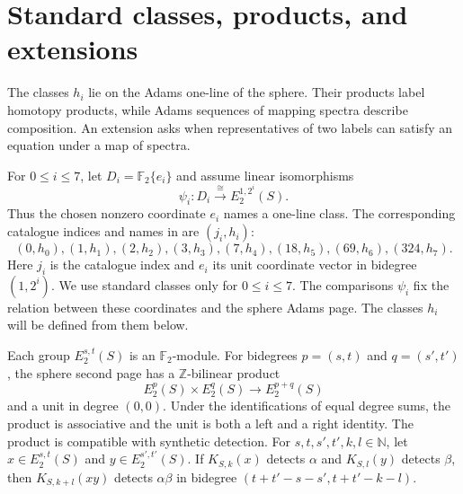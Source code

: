 \section{Standard classes, products, and extensions}

The classes $h_i$ lie on the Adams one-line of the sphere. Their products
label homotopy products, while Adams sequences of mapping spectra describe
composition. An extension asks when representatives of two labels can
satisfy an equation under a map of spectra.

\begin{definition}
\label{sem:AdamsSynthetic:hi-data}
For $0\leq i\leq7$, let $D_i=\mathbb F_2\{e_i\}$ and assume linear
isomorphisms
\[
 \psi_i:D_i\xrightarrow{\cong}E_2^{1,2^i}(S).
\]
Thus the chosen nonzero coordinate $e_i$ names a one-line class. The
corresponding catalogue indices and names in \cite{LinProgram} are
$(j_i,h_i)$:
\[
(0,h_0),(1,h_1),(2,h_2),(3,h_3),(7,h_4),(18,h_5),(69,h_6),(324,h_7).
\]
Here $j_i$ is the catalogue index and $e_i$ its unit coordinate vector
in bidegree $(1,2^i)$. We use standard classes only for
$0\leq i\leq7$.
The comparisons $\psi_i$ fix the relation between these coordinates
and the sphere Adams page. The classes $h_i$ will be defined from them
below.
\end{definition}

\begin{definition}
\label{sem:AdamsSynthetic:sphere-second-page-algebra}
Each group $E_2^{s,t}(S)$ is an $\mathbb F_2$-module. For bidegrees
$p=(s,t)$ and $q=(s',t')$, the sphere second page has a
$\mathbb Z$-bilinear product
\[
E_2^p(S)\times E_2^q(S)\longrightarrow E_2^{p+q}(S)
\]
and a unit in degree $(0,0)$. Under the identifications of equal degree sums, the product is associative and the unit is both a left and a right identity.
The product is compatible with synthetic detection. For
$s,t,s',t',k,l\in\mathbb N$, let $x\in E_2^{s,t}(S)$ and
$y\in E_2^{s',t'}(S)$. If $K_{S,k}(x)$ detects $\alpha$ and
$K_{S,l}(y)$ detects $\beta$, then $K_{S,k+l}(xy)$ detects
$\alpha\beta$ in bidegree $(t+t'-s-s',t+t'-k-l)$.
\end{definition}

